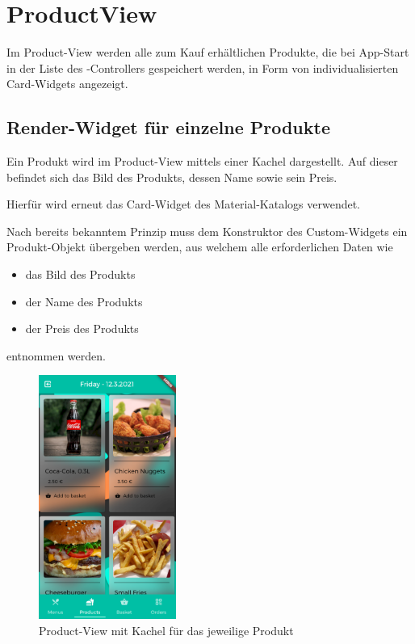 \section{ProductView}
\label{productview}

Im Product-View werden alle zum Kauf erhältlichen Produkte, die bei App-Start in der Liste des
-Controllers gespeichert werden, in Form von individualisierten Card-Widgets angezeigt.

\subsection{Render-Widget für einzelne Produkte}

Ein Produkt wird im Product-View mittels einer Kachel dargestellt. Auf dieser befindet sich 
das Bild des Produkts, dessen Name sowie sein Preis.

Hierfür wird erneut das Card-Widget des Material-Katalogs verwendet.

Nach bereits bekanntem Prinzip muss dem Konstruktor des Custom-Widgets ein Produkt-Objekt
übergeben werden, aus welchem alle erforderlichen Daten wie

\begin{itemize}
    \item das Bild des Produkts
    \item der Name des Produkts
    \item der Preis des Produkts
\end{itemize}

entnommen werden.

\begin{figure}[H]
    \centering
    \includegraphics[width=0.40\textwidth]{images/Client/views/productview/productview.png}
    \caption{Product-View mit Kachel für das jeweilige Produkt}
\end{figure}

